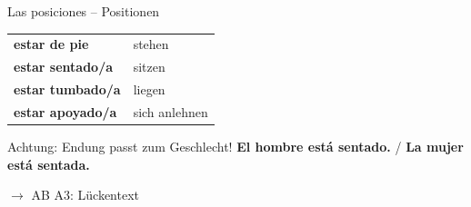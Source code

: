 \documentclass[aspectratio=169, 14pt]{beamer}
\newcommand{\es}[1]{\textbf{#1}}
\newcommand{\abmark}[1]{\textcolor{spanisch}{$\rightarrow$ AB #1}}
\begin{document}
\begin{frame}{Las posiciones – Positionen}

\begin{center}
\Large

\begin{tabular}{ll}
\es{estar de pie} & stehen \\[0.8em]
\es{estar sentado/a} & sitzen \\[0.8em]
\es{estar tumbado/a} & liegen \\[0.8em]
\es{estar apoyado/a} & sich anlehnen \\
\end{tabular}

\end{center}

\vspace{1em}

\begin{alertblock}{Achtung: Endung passt zum Geschlecht!}
\es{El hombre está sentado.} / \es{La mujer está sentada.}
\end{alertblock}

\abmark{A3: Lückentext}

\end{frame}
\end{document}
